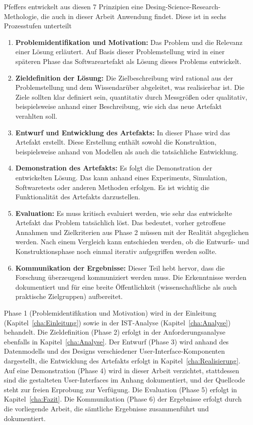 Pfeffers entwickelt aus diesen 7 Prinzipien eine Desing-Science-Research-Methologie, die auch in dieser Arbeit Anwendung findet. Diese ist in sechs Prozesstufen unterteilt 
\begin{enumerate}
    \item \textbf{Problemidentifikation und Motivation:} Das Problem und die Relevanz einer Lösung erläutert. Auf Basis dieser Problemstellung wird in einer späteren Phase das Softwareartefakt als Lösung dieses Problems entwickelt. 
    \item \textbf{Zieldefinition der Lösung:} Die Zielbeschreibung wird rational aus der Problemstellung und dem Wissendarüber abgeleitet, was realisierbar ist. Die Ziele sollten klar definiert sein, quantitativ durch Messgrößen oder qualitativ, beispielsweise anhand einer Beschreibung, wie sich das neue Artefakt verahlten soll.
    \item \textbf{Entwurf und Entwicklung des Artefakts:} In dieser Phase wird das Artefakt erstellt. Diese Erstellung enthält sowohl die Konstruktion, beispielsweise anhand von Modellen als auch die tatsächliche Entwicklung. 
    \item \textbf{Demonstration des Artefakts:} Es folgt die Demonstration der entwickelten Lösung. Das kann anhand eines Experiments, Simulation, Softwaretests oder anderen Methoden erfolgen. Es ist wichtig die Funktionalität des Artefakts darzustellen. 
    \item \textbf{Evaluation:} Es muss kritisch evaluiert werden, wie sehr das entwickelte Artefakt das Problem tatsächlich löst. Das bedeutet, vorher getroffene Annahmen und Zielkriterien aus Phase 2 müssen mit der Realität abgeglichen werden. Nach einem Vergleich kann entschieden werden, ob die Entwurfs- und Konstruktionsphase noch einmal iterativ aufgegriffen werden sollte. 
    \item \textbf{Kommunikation der Ergebnisse:} Dieser Teil hebt hervor, dass die Forschung überzeugend kommuniziert werden muss. Die Erkenntnisse werden dokumentiert und für eine breite Öffentlichkeit (wissenschaftliche als auch praktische Zielgruppen) aufbereitet. 
\end{enumerate}

Phase 1 (Problemidentifikation und Motivation) wird in der Einleitung (Kapitel~\ref{cha:Einleitung}) sowie in der IST-Analyse (Kapitel~\ref{cha:Analyse}) behandelt. Die Zieldefinition (Phase 2) erfolgt in der Anforderungsanalyse ebenfalls in Kapitel~\ref{cha:Analyse}. Der Entwurf (Phase 3) wird anhand des Datenmodells und des Designs verschiedener User-Interface-Komponenten dargestellt, die Entwicklung des Artefakts erfolgt in Kapitel~\ref{cha:Realisierung}. Auf eine Demonstration (Phase 4) wird in dieser Arbeit verzichtet, stattdessen sind die gestalteten User-Interfaces im Anhang dokumentiert, und der Quellcode steht zur freien Erprobung zur Verfügung. Die Evaluation (Phase 5) erfolgt in Kapitel~\ref{cha:Fazit}. Die Kommunikation (Phase 6) der Ergebnisse erfolgt durch die vorliegende Arbeit, die sämtliche Ergebnisse zusammenführt und dokumentiert. 